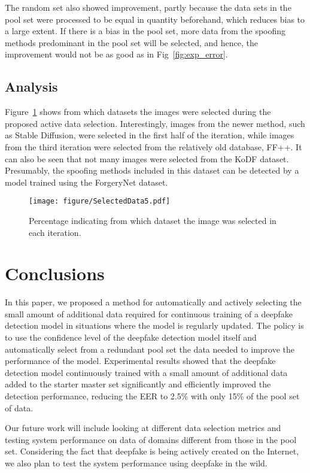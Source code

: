 \documentclass[english]{lni}
\begin{document}
The random set also showed improvement, partly because the data sets in the pool set were processed to be equal in quantity beforehand, which reduces bias to a large extent. If there is a bias in the pool set, more data from the spoofing methods predominant in the pool set will be selected, and hence, the improvement would not be as good as in Fig~\ref{fig:exp_error}.

\subsection{Analysis}

Figure~\ref{fig:exp_data} shows from which datasets the images were selected during the proposed active data selection. Interestingly, images from the newer method, such as Stable Diffusion, were selected in the first half of the iteration, while images from the third iteration were selected from the relatively old database, FF++. It can also be seen that not many images were selected from the KoDF dataset. Presumably, the spoofing methods included in this dataset can be detected by a model trained using the ForgeryNet dataset. 

\begin{figure}[t!]
\centering
\texttt{[image: figure/SelectedData5.pdf]}
\caption{Percentage indicating from which dataset the image was selected in each iteration.} 
\label{fig:exp_data}
\end{figure}

\section{Conclusions}

In this paper, we proposed a method for automatically and actively selecting the small amount of additional data required for continuous training of a deepfake detection model in situations where the model is regularly updated. The policy is to use the confidence level of the deepfake detection model itself and automatically select from a redundant pool set the data needed to improve the performance of the model. Experimental results showed that the deepfake detection model continuously trained with a small amount of additional data added to the starter master set significantly and efficiently improved the detection performance, reducing the EER to 2.5\% with only 15\% of the pool set of data.

Our future work will include looking at different data selection metrics and testing system performance on data of domains different from those in the pool set. Considering the fact that deepfake is being actively created on the Internet, we also plan to test the system performance using deepfake in the wild.
\end{document}
